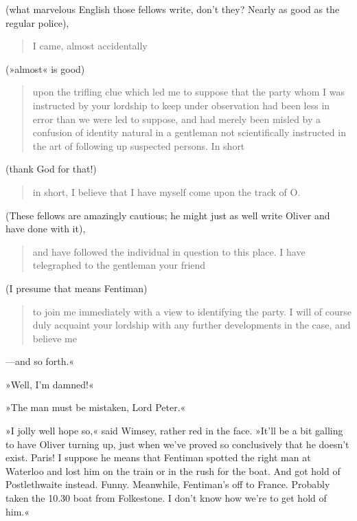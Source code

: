 (what marvelous English those fellows write, don't they? Nearly as good as the regular police), 

\begin{quotation}I came, almost accidentally\end{quotation} 

(»almost« is good) 

\begin{quotation}
	upon the trifling clue which led me to suppose that the party whom I was instructed by your lordship to keep under observation had been less in error than we were led to suppose, and had merely been misled by a confusion of identity natural in a gentleman not scientifically instructed in the art of following up suspected persons. In short
\end{quotation} 

(thank God for that!) 

\begin{quotation}
in short, I believe that I have myself come upon the track of O.
\end{quotation} 

(These fellows are amazingly cautious; he might just as well write Oliver and have done with it), 

\begin{quotation}
and have followed the individual in question to this place. I have telegraphed to the gentleman your friend
\end{quotation} 

(I presume that means Fentiman) 

\begin{quotation}to join me immediately with a view to identifying the party. I will of course duly acquaint your lordship with any further developments in the case, and believe me\end{quotation}---and so forth.«

»Well, I'm damned!«

»The man must be mistaken, Lord Peter.«

»I jolly well hope so,« said Wimsey, rather red in the face. »It'll be a bit galling to have Oliver turning up, just when we've proved so conclusively that he doesn't exist. Paris! I suppose he means that Fentiman spotted the right man at Waterloo and lost him on the train or in the rush for the boat. And got hold of Postlethwaite instead. Funny. Meanwhile, Fentiman's off to France. Probably taken the 10.30 boat from Folkestone. I don't know how we're to get hold of him.«

